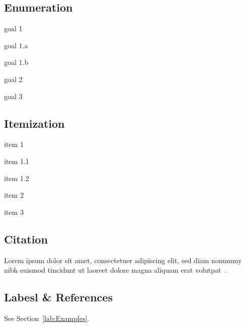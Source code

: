 \subsection{Enumeration}
\begin{my_enumerate}
	\item {goal 1}
	\begin{my_enumerate}
		\item {goal 1.a}
		\item {goal 1.b}
	\end{my_enumerate}
	\item {goal 2}
	\item {goal 3}
\end{my_enumerate}
\subsection{Itemization}
\begin{my_itemize}
	\item {item 1}
	\begin{my_itemize}
		\item {item 1.1}
		\item {item 1.2}
	\end{my_itemize}
	\item {item 2}
	\item {item 3}
\end{my_itemize}
\subsection{Citation}
Lorem ipsum dolor sit amet, consectetuer adipiscing elit, sed diam nonummy nibh euismod tincidunt ut laoreet dolore magna aliquam erat volutpat~\cite{1}.

\subsection{Labesl \& References}
See Section~\ref{lab:Examples}.

